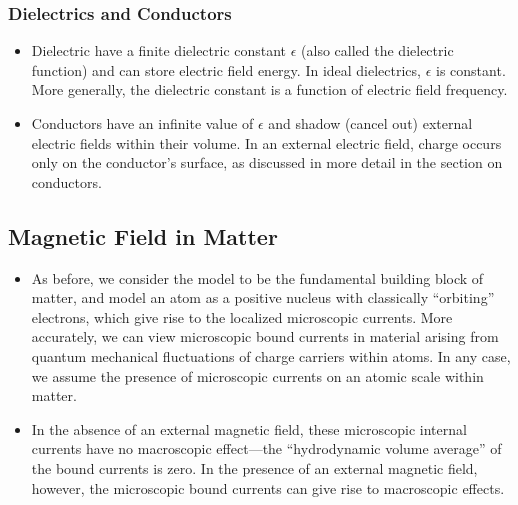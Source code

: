\documentclass[11pt, a4paper]{article}
\newcommand{\e}{\epsilon}
\begin{document}
\subsubsection{Dielectrics and Conductors}
\begin{itemize}
	\item Dielectric have a finite dielectric constant $ \epsilon $ (also called the dielectric function) and can store electric field energy. In ideal dielectrics, $ \epsilon $ is constant. More generally, the dielectric constant is a function of electric field frequency.
	
	\item Conductors have an infinite value of $ \e $ and shadow (cancel out) external electric fields within their volume. In an external electric field, charge occurs only on the conductor's surface, as discussed in more detail in the section on conductors.
\end{itemize}

\subsection{Magnetic Field in Matter}
\begin{itemize}
	\item As before, we consider the model to be the fundamental building block of matter, and model an atom as a positive nucleus with classically ``orbiting'' electrons, which give rise to the localized microscopic currents. More accurately, we can view microscopic bound currents in material arising from quantum mechanical fluctuations of charge carriers within atoms. In any case, we assume the presence of microscopic currents on an atomic scale within matter. 
	
	\item In the absence of an external magnetic field, these microscopic internal currents have no macroscopic effect---the ``hydrodynamic volume average'' of the bound currents is zero. In the presence of an external magnetic field, however, the microscopic bound currents can give rise to macroscopic effects. 
\end{itemize}
\end{document}
